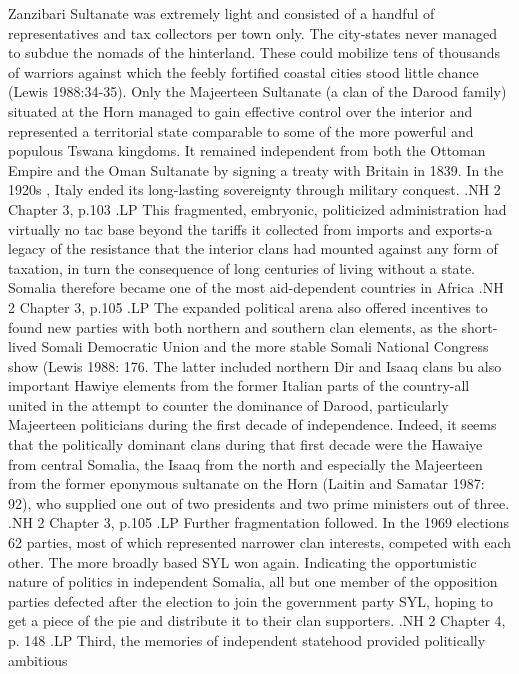 \documentclass[12pt]{article}
\begin{document}
Zanzibari Sultanate was extremely light and consisted of a handful of
representatives and tax collectors per town only.  The city-states never managed
to subdue the nomads of the hinterland.  These could mobilize tens of thousands
of warriors against which the feebly fortified coastal cities stood little
chance (Lewis 1988:34-35).  Only the Majeerteen Sultanate (a clan of the Darood
family) situated at the Horn managed to gain effective control over the interior
and represented a territorial state comparable to some of the more powerful and
populous Tswana kingdoms.  It remained independent from both the Ottoman Empire
and the Oman Sultanate by signing a treaty with Britain in 1839.  In the 1920s ,
Italy ended its long-lasting sovereignty through military conquest.
.NH 2
Chapter 3, p.103
.LP
This fragmented, embryonic, politicized administration had virtually no tac base
beyond the tariffs it collected from imports and exports-a legacy of the
resistance that the interior clans had mounted against any form of taxation, in
turn the consequence of long centuries of living without a state.  Somalia
therefore became one of the most aid-dependent countries in Africa
.NH 2
Chapter 3, p.105
.LP
The expanded political arena also offered incentives to found new parties with
both northern and southern clan elements, as the short-lived Somali Democratic
Union and the more stable Somali National Congress show (Lewis 1988: 176.  The
latter included northern Dir and Isaaq clans bu also important Hawiye elements
from the former Italian parts of the country-all united in the attempt to
counter the dominance of Darood, particularly Majeerteen politicians during the
first decade of independence.  Indeed, it seems that the politically dominant
clans during that first decade were the Hawaiye from central Somalia, the Isaaq
from the north and especially the Majeerteen from the former eponymous sultanate
on the Horn (Laitin and Samatar 1987: 92), who supplied one out of two
presidents and two prime ministers out of three.
.NH 2
Chapter 3, p.105
.LP
Further fragmentation followed.  In the 1969 elections 62 parties, most of
which represented narrower clan interests, competed with each other.  The more
broadly based SYL won again.  Indicating the opportunistic nature of politics in
independent Somalia, all but one member of the opposition parties defected after
the election to join the government party SYL, hoping to get a piece of the pie
and distribute it to their clan supporters.
.NH 2
Chapter 4, p. 148
.LP
Third, the memories of independent statehood provided politically ambitious
\end{document}
